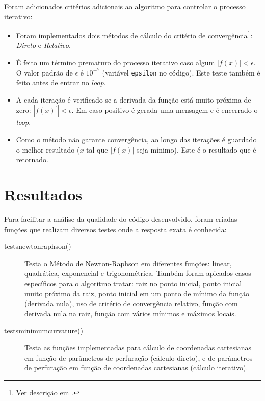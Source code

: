\documentclass[final,3p,12pt]{elsarticle}
\begin{document}
    Foram adicionados critérios adicionais ao algoritmo para controlar o processo iterativo:

    \begin{itemize}
        \item Foram implementados dois métodos de cálculo do critério de convergência\footnote{Ver descrição em \cite{relatoriobisseccao}.}: \emph{Direto} e \emph{Relativo}.
        \item É feito um término prematuro do processo iterativo caso algum $|f(x)| < \epsilon$. O valor padrão de $\epsilon$ é $10^{-7}$ (variável \verb|epsilon| no código). Este teste também é feito antes de entrar no \emph{loop}.
        \item A cada iteração é verificado se a derivada da função está muito próxima de zero: $|f(x)^{\prime}| < \epsilon$. Em caso positivo é gerada uma mensagem e é encerrado o \emph{loop}.
        \item Como o método não garante convergência, ao longo das iterações é guardado o melhor resultado ($x$ tal que $|f(x)|$ seja mínimo). Este é o resultado que é retornado.
    \end{itemize}
    
    \section{Resultados}
    
    Para facilitar a análise da qualidade do código desenvolvido, foram criadas funções que realizam diversos testes onde a resposta exata é conhecida:

    \begin{description}
        \item[tests\textunderscore newton\textunderscore raphson()] Testa o Método de Newton-Raphson em diferentes funções: linear, quadrática, exponencial e trigonométrica. Também foram apicados casos específicos para o algoritmo tratar: raiz no ponto inicial, ponto inicial muito próximo da raiz, ponto inicial em um ponto de mínimo da função (derivada nula), uso de critério de convergência relativo, função com derivada nula na raiz, função com vários mínimos e máximos locais.
        
        \item[tests\textunderscore minimum\textunderscore curvature()] Testa as funções implementadas para cálculo de coordenadas cartesianas em função de parâmetros de perfuração (cálculo direto), e de parâmetros de perfuração em função de coordenadas cartesianas (cálculo iterativo).
    \end{description}
\end{document}

